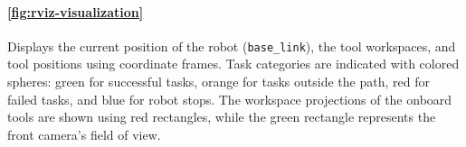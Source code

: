 \paragraph{\autoref{fig:rviz-visualization}} Displays the current position of the robot (\texttt{base\_link}), the tool workspaces, and tool positions using coordinate frames. Task categories are indicated with colored spheres: green for successful tasks, orange for tasks outside the path, red for failed tasks, and blue for robot stops. The workspace projections of the onboard tools are shown using red rectangles, while the green rectangle represents the front camera’s field of view.

